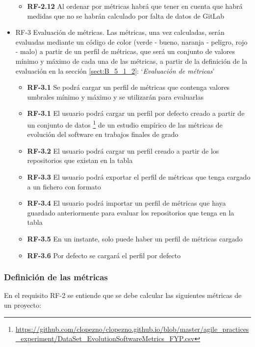 \begin{itemize}
\begin{itemize}
		\item \textbf{RF-2.12} Al ordenar por métricas habrá que tener en cuenta que habrá medidas que no se habrán calculado por falta de datos de GitLab
	\end{itemize}
	\item RF-3 Evaluación de métricas. Las métricas, una vez calculadas, serán evaluadas mediante un código de color (verde - bueno, naranja - peligro, rojo - malo) a partir de un perfil de métricas, que será un conjunto de valores mínimo y máximo de cada una de las métricas, a partir de la definición de la evaluación en la sección \ref{sect:B_5_1_2}: `\textit{Evaluación de métricas}'
	\begin{itemize}
		\item \textbf{RF-3.1} Se podrá cargar un perfil de métricas que contenga valores umbrales mínimo y máximo y se utilizarán para evaluarlas
		\item \textbf{RF-3.1} El usuario podrá cargar un perfil por defecto creado a partir de un conjunto de datos \footnote{\url{https://github.com/clopezno/clopezno.github.io/blob/master/agile_practices_experiment/DataSet_EvolutionSoftwareMetrics_FYP.csv}} de un estudio empírico de las métricas de evolución del software en trabajos finales de grado\cite{lopez_nozal_measuring_2019}
		\item \textbf{RF-3.2} El usuario podrá cargar un perfil creado a partir de los repositorios que existan en la tabla
		\item \textbf{RF-3.3} El usuario podrá exportar el perfil de métricas que tenga cargado a un fichero con formato 
		\item \textbf{RF-3.4} El usuario podrá importar un perfil de métricas que haya guardado anteriormente para evaluar los repositorios que tenga en la tabla
		\item \textbf{RF-3.5} En un instante, solo puede haber un perfil de métricas cargado
		\item \textbf{RF-3.6} Por defecto se cargará el perfil por defecto
	\end{itemize}
\end{itemize}

\subsubsection{Definición de las métricas}\label{sect:B_5_1_1}

En el requisito RF-2 se entiende que se debe calcular las siguientes métricas de un proyecto:

